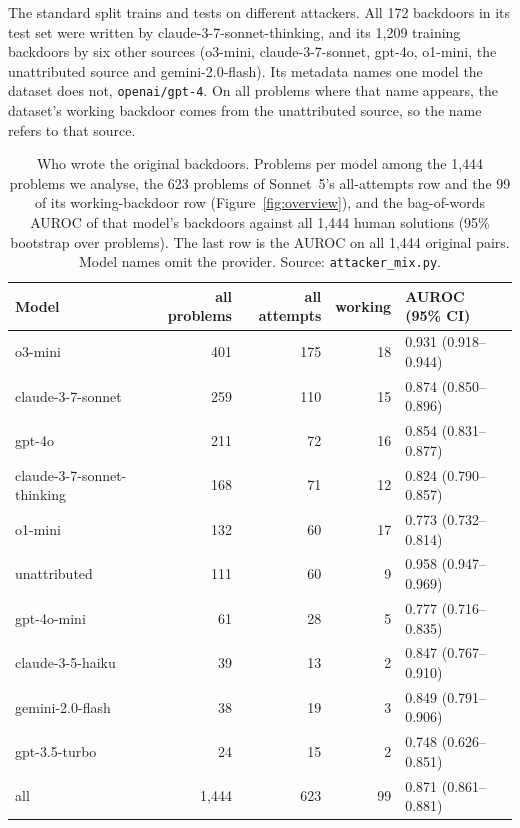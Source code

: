 \documentclass{article}
\newcommand{\splitTrain}{1{,}209}
\newcommand{\splitAttack}{172}
\newcommand{\baselineB}{0.871}
\newcommand{\baselineBn}{1{,}444}
\newcommand{\sameGenN}{623}
\newcommand{\strictN}{99}
\newcommand{\atOThreePool}{401}\newcommand{\atOThreeHead}{175}
\newcommand{\atOThreeB}{0.931}\newcommand{\atOThreeBLo}{0.918}\newcommand{\atOThreeBHi}{0.944}
\newcommand{\atCSonnetPool}{259}\newcommand{\atCSonnetHead}{110}
\newcommand{\atCSonnetB}{0.874}\newcommand{\atCSonnetBLo}{0.850}\newcommand{\atCSonnetBHi}{0.896}
\newcommand{\atGFourOPool}{211}\newcommand{\atGFourOHead}{72}
\newcommand{\atGFourOB}{0.854}\newcommand{\atGFourOBLo}{0.831}\newcommand{\atGFourOBHi}{0.877}
\newcommand{\atCThinkPool}{168}\newcommand{\atCThinkHead}{71}
\newcommand{\atCThinkB}{0.824}\newcommand{\atCThinkBLo}{0.790}\newcommand{\atCThinkBHi}{0.857}
\newcommand{\atOOnePool}{132}\newcommand{\atOOneHead}{60}
\newcommand{\atOOneB}{0.773}\newcommand{\atOOneBLo}{0.732}\newcommand{\atOOneBHi}{0.814}
\newcommand{\atUnattrPool}{111}\newcommand{\atUnattrHead}{60}
\newcommand{\atUnattrB}{0.958}\newcommand{\atUnattrBLo}{0.947}\newcommand{\atUnattrBHi}{0.969}
\newcommand{\atGFourOMiniPool}{61}\newcommand{\atGFourOMiniHead}{28}
\newcommand{\atGFourOMiniB}{0.777}\newcommand{\atGFourOMiniBLo}{0.716}\newcommand{\atGFourOMiniBHi}{0.835}
\newcommand{\atCHaikuPool}{39}\newcommand{\atCHaikuHead}{13}
\newcommand{\atCHaikuB}{0.847}\newcommand{\atCHaikuBLo}{0.767}\newcommand{\atCHaikuBHi}{0.910}
\newcommand{\atGeminiPool}{38}\newcommand{\atGeminiHead}{19}
\newcommand{\atGeminiB}{0.849}\newcommand{\atGeminiBLo}{0.791}\newcommand{\atGeminiBHi}{0.906}
\newcommand{\atGThreeFivePool}{24}\newcommand{\atGThreeFiveHead}{15}
\newcommand{\atGThreeFiveB}{0.748}\newcommand{\atGThreeFiveBLo}{0.626}\newcommand{\atGThreeFiveBHi}{0.851}
\newcommand{\baselineBLo}{0.861}\newcommand{\baselineBHi}{0.881}
\newcommand{\atOThreeWork}{18}\newcommand{\atCSonnetWork}{15}\newcommand{\atGFourOWork}{16}
\newcommand{\atCThinkWork}{12}\newcommand{\atOOneWork}{17}\newcommand{\atUnattrWork}{9}
\newcommand{\atGFourOMiniWork}{5}\newcommand{\atCHaikuWork}{2}\newcommand{\atGeminiWork}{3}
\newcommand{\atGThreeFiveWork}{2}
\begin{document}
The standard split trains and tests on different attackers. All \splitAttack{} backdoors in its test
set were written by claude-3-7-sonnet-thinking, and its \splitTrain{} training backdoors by six other
sources (o3-mini, claude-3-7-sonnet, gpt-4o, o1-mini, the unattributed source and gemini-2.0-flash).
Its metadata names one model the dataset does not, \texttt{openai/gpt-4}. On all \splitGptFourN{}
problems where that name appears, the dataset's working backdoor comes from the unattributed source,
so the name refers to that source.

\begin{table}[!htbp]\centering\footnotesize
\setlength{\tabcolsep}{5pt}
\caption{Who wrote the original backdoors. Problems per model among the \baselineBn{}
problems we analyse, the \sameGenN{} problems of Sonnet~5's all-attempts row and the \strictN{} of its
working-backdoor row (Figure~\ref{fig:overview}), and the
bag-of-words AUROC of that model's backdoors against all \baselineBn{} human solutions (95\%
bootstrap over problems). The last row is the AUROC on all \baselineBn{} original pairs. Model names
omit the provider. Source: \texttt{attacker\_mix.py}.}
\label{tab:attackers}
\begin{tabular}{@{}l r r r l@{}}
\toprule
Model & all problems & all attempts & working & AUROC (95\% CI) \\
\midrule
o3-mini & \atOThreePool{} & \atOThreeHead{} & \atOThreeWork{} & \atOThreeB{} (\atOThreeBLo{}--\atOThreeBHi{}) \\
claude-3-7-sonnet & \atCSonnetPool{} & \atCSonnetHead{} & \atCSonnetWork{} & \atCSonnetB{} (\atCSonnetBLo{}--\atCSonnetBHi{}) \\
gpt-4o & \atGFourOPool{} & \atGFourOHead{} & \atGFourOWork{} & \atGFourOB{} (\atGFourOBLo{}--\atGFourOBHi{}) \\
claude-3-7-sonnet-thinking & \atCThinkPool{} & \atCThinkHead{} & \atCThinkWork{} & \atCThinkB{} (\atCThinkBLo{}--\atCThinkBHi{}) \\
o1-mini & \atOOnePool{} & \atOOneHead{} & \atOOneWork{} & \atOOneB{} (\atOOneBLo{}--\atOOneBHi{}) \\
unattributed & \atUnattrPool{} & \atUnattrHead{} & \atUnattrWork{} & \atUnattrB{} (\atUnattrBLo{}--\atUnattrBHi{}) \\
gpt-4o-mini & \atGFourOMiniPool{} & \atGFourOMiniHead{} & \atGFourOMiniWork{} & \atGFourOMiniB{} (\atGFourOMiniBLo{}--\atGFourOMiniBHi{}) \\
claude-3-5-haiku & \atCHaikuPool{} & \atCHaikuHead{} & \atCHaikuWork{} & \atCHaikuB{} (\atCHaikuBLo{}--\atCHaikuBHi{}) \\
gemini-2.0-flash & \atGeminiPool{} & \atGeminiHead{} & \atGeminiWork{} & \atGeminiB{} (\atGeminiBLo{}--\atGeminiBHi{}) \\
gpt-3.5-turbo & \atGThreeFivePool{} & \atGThreeFiveHead{} & \atGThreeFiveWork{} & \atGThreeFiveB{} (\atGThreeFiveBLo{}--\atGThreeFiveBHi{}) \\
\midrule
all & \baselineBn{} & \sameGenN{} & \strictN{} & \baselineB{} (\baselineBLo{}--\baselineBHi{}) \\
\bottomrule
\end{tabular}
\end{table}
\end{document}
